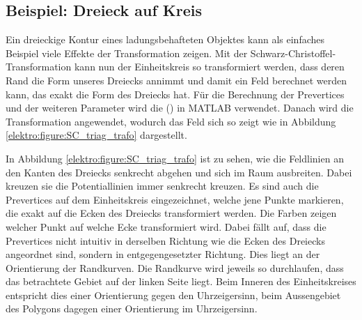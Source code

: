 \subsection{Beispiel: Dreieck auf Kreis}
Ein dreieckige Kontur eines ladungsbehafteten Objektes kann als einfaches Beispiel viele Effekte der Transformation zeigen.
Mit der Schwarz-Christoffel-Transformation kann nun der Einheitskreis so transformiert werden, dass deren Rand die Form unseres Dreiecks annimmt und damit ein Feld berechnet werden kann, das exakt die Form des Dreiecks hat.
Für die Berechnung der Prevertices und der weiteren Parameter wird die (\cite[Schwarz-Christoffel-Toolbox]{elektro:sc-toolbox}) in MATLAB verwendet.
Danach wird die Transformation angewendet, wodurch das Feld sich so zeigt wie in Abbildung \ref{elektro:figure:SC_triag_trafo} dargestellt.


%


In Abbildung \ref{elektro:figure:SC_triag_trafo} ist zu sehen, wie die Feldlinien an den Kanten des Dreiecks senkrecht abgehen und sich im Raum ausbreiten.
Dabei kreuzen sie die Potentiallinien immer senkrecht kreuzen.
Es sind auch die Prevertices auf dem Einheitskreis eingezeichnet, welche jene Punkte markieren, die exakt auf die Ecken des Dreiecks transformiert werden.
Die Farben zeigen welcher Punkt auf welche Ecke transformiert wird.
Dabei fällt auf, dass die Prevertices nicht intuitiv in derselben Richtung wie die Ecken des Dreiecks angeordnet sind, sondern in entgegengesetzter Richtung.
Dies liegt an der Orientierung der Randkurven.
Die Randkurve wird jeweils so durchlaufen, dass das betrachtete Gebiet auf der linken Seite liegt.
Beim Inneren des Einheitskreises entspricht dies einer Orientierung gegen den Uhrzeigersinn, beim Aussengebiet des Polygons dagegen einer Orientierung im Uhrzeigersinn.

